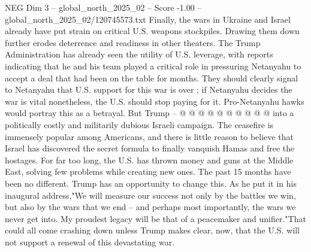 \begin{textsample}{NEG Dim 3 – global\_north\_2025\_02 – Score -1.00 – global\_north\_2025\_02/120745573.txt}
Finally, the wars in Ukraine and Israel already have put strain on critical U.S. weapons stockpiles.
Drawing them down further erodes deterrence and readiness in other theaters.
The Trump Administration has already seen the utility of U.S. leverage, with reports indicating that he and his team played a critical role in pressuring Netanyahu to accept a deal that had been on the table for months.
They should clearly signal to Netanyahu that U.S. support for this war is over ; if Netanyahu decides the war is vital nonetheless, the U.S. should stop paying for it.
Pro-Netanyahu hawks would portray this as a betrayal.
But Trump -- @ @ @ @ @ @ @ @ @ @ into a politically costly and militarily dubious Israeli campaign.
The ceasefire is immensely popular among Americans, and there is little reason to believe that Israel has discovered the secret formula to finally vanquish Hamas and free the hostages.
For far too long, the U.S. has thrown money and guns at the Middle East, solving few problems while creating new ones.
The past 15 months have been no different.
Trump has an opportunity to change this.
As he put it in his inaugural address,"We will measure our success not only by the battles we win, but also by the wars that we end -- and perhaps most importantly, the wars we never get into.
My proudest legacy will be that of a peacemaker and unifier."That could all come crashing down unless Trump makes clear, now, that the U.S. will not support a renewal of this devastating war.

\end{textsample}
